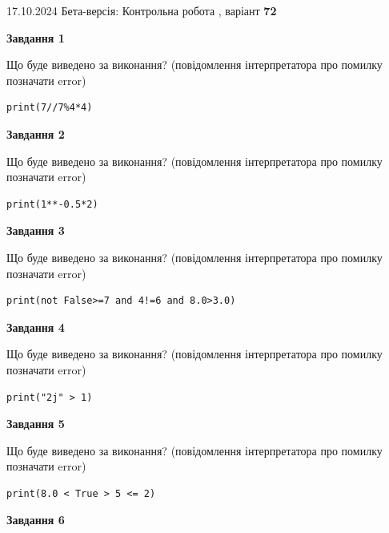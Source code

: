 \documentclass[12pt, ukrainian]{article}
\begin{document}
{\Large{17.10.2024 Бета-версія: Контрольна робота , варіант  \No \textbf { 72 }\par}}
{
\begin {large}
{\begin {center}\textbf{Завдання 1}\end {center}}

Що буде виведено за виконання? (повідомлення інтерпретатора про помилку позначати error)\par
\begin{verbatim}
print(7//7%4*4)
\end{verbatim}

{\begin {center}\textbf{Завдання 2}\end {center}}

Що буде виведено за виконання? (повідомлення інтерпретатора про помилку позначати error)\par
\begin{verbatim}
print(1**-0.5*2)
\end{verbatim}

{\begin {center}\textbf{Завдання 3}\end {center}}

Що буде виведено за виконання? (повідомлення інтерпретатора про помилку позначати error)\par
\begin{verbatim}
print(not False>=7 and 4!=6 and 8.0>3.0)
\end{verbatim}

{\begin {center}\textbf{Завдання 4}\end {center}}

Що буде виведено за виконання? (повідомлення інтерпретатора про помилку позначати error)\par
\begin{verbatim}
print("2j" > 1)
\end{verbatim}

{\begin {center}\textbf{Завдання 5}\end {center}}

Що буде виведено за виконання? (повідомлення інтерпретатора про помилку позначати error)\par
\begin{verbatim}
print(8.0 < True > 5 <= 2)
\end{verbatim}

{\begin {center}\textbf{Завдання 6}\end {center}}


\end{large}}
\end{document}
